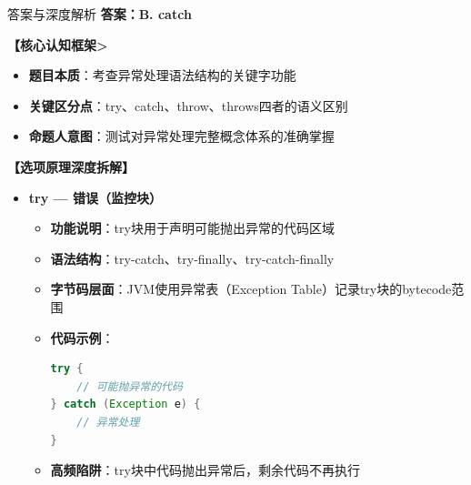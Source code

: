 \documentclass[12pt, a4paper]{ctexart}
\begin{document}
\begin{enumerate}[label=\textbf{\arabic*.}]
	      \begin{bluebox}{答案与深度解析}
		      \textbf{答案：B. catch}

		      \textbf{【核心认知框架>}
		      \begin{itemize}[label={}, leftmargin=*, nosep]
			      \item \textbf{题目本质}：考查异常处理语法结构的关键字功能
			      \item \textbf{关键区分点}：try、catch、throw、throws四者的语义区别
			      \item \textbf{命题人意图}：测试对异常处理完整概念体系的准确掌握
		      \end{itemize}

		      \textbf{【选项原理深度拆解】}

		      \begin{itemize}[leftmargin=*, nosep, label={}]
			      \item[A] \textbf{try — 错误（监控块）}
			            \begin{itemize}[label={}, leftmargin=*, nosep]
				            \item \textbf{功能说明}：try块用于声明可能抛出异常的代码区域
				            \item \textbf{语法结构}：try-catch、try-finally、try-catch-finally
				            \item \textbf{字节码层面}：JVM使用异常表（Exception Table）记录try块的bytecode范围
				            \item \textbf{代码示例}：
				                  \begin{lstlisting}[language=Java]
try {
    // 可能抛异常的代码
} catch (Exception e) {
    // 异常处理
}
				            \end{lstlisting}
				            \item \textbf{高频陷阱}：try块中代码抛出异常后，剩余代码不再执行
			            \end{itemize}


\end{itemize}
\end{bluebox}
\end{enumerate}
\end{document}

